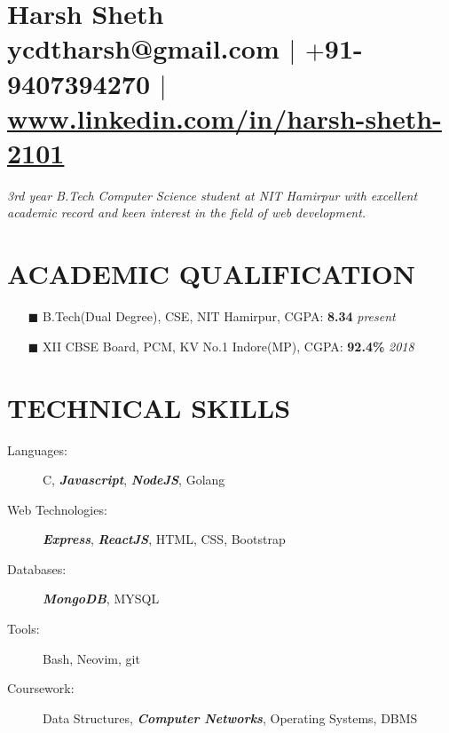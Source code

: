 \documentclass[12pt]{article}
\begin{document}
\section{Harsh Sheth\\ ycdtharsh@gmail.com $|$ $+$91-9407394270 $|$  \url{www.linkedin.com/in/harsh-sheth-2101}}
\par{\textit{3rd year B.Tech Computer Science student at NIT Hamirpur with excellent academic record and keen interest in the field of web development.}}

\section{ACADEMIC QUALIFICATION}
\begin{itemize}
  \item[$\blacksquare$]{B.Tech(Dual Degree), CSE, {\normalsize \normalfont NIT Hamirpur, CGPA:\textbf{ 8.34}} \hfill \emph{present}} 
  \item[$\blacksquare$]{XII CBSE Board, PCM, {\normalsize \normalfont KV No.1 Indore(MP), CGPA:\textbf{ 92.4\%}} \hfill \emph{2018}} 
\end{itemize}

\section{TECHNICAL SKILLS}
\begin{description}
  \item[\normalfont Languages:]{C, \textbf{\textit{Javascript}}, \textbf{\textit{NodeJS}}, Golang}
  \item[\normalfont Web Technologies:]{\textbf{\textit{Express}}, \textbf{\textit{ReactJS}}, HTML, CSS, Bootstrap}
  \item[\normalfont Databases:]{\textbf{\textit{MongoDB}}, MYSQL}
  \item[\normalfont Tools:]{Bash, Neovim, git}
  \item[\normalfont Coursework:]{Data Structures, \textbf{\textit{Computer Networks}}, Operating Systems, DBMS}
\end{description}
\end{document}
